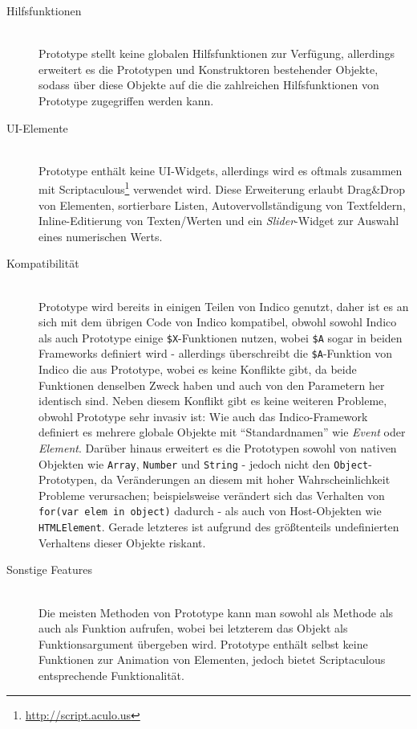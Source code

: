 \begin{description}
\item[Hilfsfunktionen] \hfill \\
Prototype stellt keine globalen Hilfsfunktionen zur Verfügung, allerdings erweitert es die
Prototypen und Konstruktoren bestehender Objekte, sodass über diese Objekte auf die die zahlreichen
Hilfsfunktionen von Prototype zugegriffen werden kann.

\item[UI-Elemente] \hfill \\
Prototype enthält keine UI-Widgets, allerdings wird es oftmals zusammen mit
Scriptaculous\footnote{\href{http://script.aculo.us}{http://script.aculo.us}} verwendet wird. Diese
Erweiterung erlaubt Drag\&Drop von Elementen, sortierbare Listen, Autovervollständigung von
Textfeldern, Inline-Editierung von Texten/Werten und ein \emph{Slider}-Widget zur Auswahl eines
numerischen Werts.

\item[Kompatibilität] \hfill \\
Prototype wird bereits in einigen Teilen von Indico genutzt, daher ist es an sich mit dem übrigen
Code von Indico kompatibel, obwohl sowohl Indico als auch Prototype einige
\lstinline{$X}-Funktionen nutzen, wobei \lstinline{$A} sogar in beiden Frameworks definiert wird -
allerdings überschreibt die \lstinline{$A}-Funktion von Indico die aus Prototype, wobei es keine
Konflikte gibt, da beide Funktionen denselben Zweck haben und auch von den Parametern her
identisch sind. Neben diesem Konflikt gibt es keine weiteren Probleme, obwohl Prototype sehr invasiv
ist: Wie auch das Indico-Framework definiert es mehrere globale Objekte mit \enquote{Standardnamen}
wie \emph{Event} oder \emph{Element}. Darüber hinaus erweitert es die Prototypen sowohl von nativen
Objekten wie \lstinline{Array}, \lstinline{Number} und \lstinline{String} - jedoch nicht den
\lstinline{Object}-Prototypen, da Veränderungen an diesem mit hoher Wahrscheinlichkeit Probleme
verursachen; beispielsweise verändert sich das Verhalten von \lstinline{for(var elem in object)}
dadurch - als auch von Host-Objekten wie \lstinline{HTMLElement}. Gerade letzteres ist aufgrund des
größtenteils undefinierten Verhaltens dieser Objekte riskant.

\item[Sonstige Features] \hfill \\
Die meisten Methoden von Prototype kann man sowohl als Methode als auch als Funktion aufrufen, wobei
bei letzterem das Objekt als Funktionsargument übergeben wird. Prototype enthält selbst keine
Funktionen zur Animation von Elementen, jedoch bietet Scriptaculous entsprechende Funktionalität.


\end{description}
